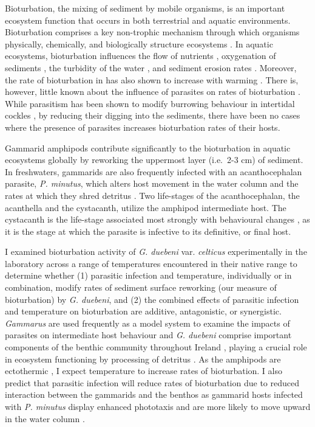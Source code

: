 Bioturbation, the mixing of sediment by mobile organisms, is an important ecosystem function that occurs in both terrestrial and aquatic environments. Bioturbation comprises a key non-trophic mechanism through which organisms physically, chemically, and biologically structure ecosystems \citep{grant1994, Jones1996, baranov2016, wohlgemuth2017}. In aquatic ecosystems, bioturbation influences the flow of nutrients \citep{mermillod2006}, oxygenation of sediments \citep{baranov2016}, the turbidity of the water \citep{croel2011}, and sediment erosion rates \citep{grant1994}. Moreover, the rate of bioturbation in has also shown to increase with warming \citep{baranov2016}. There is, however, little known about the influence of parasites on rates of bioturbation \citep{vannatta2018}. While parasitism has been shown to modify burrowing behaviour in intertidal cockles \citep{mouritsen2005}, by reducing their digging into the sediments, there have been no cases where the presence of parasites increases bioturbation rates of their hosts. 

Gammarid amphipods contribute significantly to the bioturbation in aquatic ecosystems globally \citep{mermillod2006, hunting2012, denadai2013, vadher2015} by reworking the uppermost layer (i.e.\ 2-3 cm) of sediment. In freshwaters, gammarids are also frequently infected with an acanthocephalan parasite,\emph{ P. minutus}, which alters host movement in the water column and the rates at which they shred detritus \citep{bauer2005, labaude2016}. Two life-stages of the acanthocephalan, the acanthella and the cystacanth, utilize the amphipod intermediate host. The cystacanth is the life-stage associated most strongly with behavioural changes \citep{bailly2017}, as it is the stage at which the parasite is infective to its definitive, or final host. 

I examined bioturbation activity of \emph{G. duebeni} var. \emph{celticus} experimentally in the laboratory across a range of temperatures encountered in their native range to determine whether (1) parasitic infection and temperature, individually or in combination, modify rates of sediment surface reworking (our measure of bioturbation) by \emph{G. duebeni}, and (2) the combined effects of parasitic infection and temperature on bioturbation are additive, antagonistic, or synergistic. \emph{Gammarus} are used frequently as a model system to examine the impacts of parasites on intermediate host behaviour \citep{agatz2014, perrot2014, perrot2016} and \emph{G. duebeni} comprise important components of the benthic community throughout Ireland \citep{reid1938, macneil2009}, playing a crucial role in ecosystem functioning by processing of detritus \citep{kelly2002}. As the amphipods are ectothermic \citep{baranov2016}, I expect temperature to increase rates of bioturbation. I also predict that parasitic infection will reduce rates of bioturbation due to reduced interaction between the gammarids and the benthos as gammarid hosts infected with \emph{P. minutus} display enhanced phototaxis and are more likely to move upward in the water column \citep[Chapter \ref{chap:physbeh}]{perrot2016}. 


